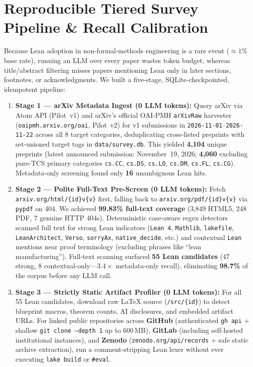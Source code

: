 \documentclass[11pt,letterpaper]{article}
\begin{document}
\section{Reproducible Tiered Survey Pipeline \& Recall Calibration}
\label{sec:pipeline}

Because Lean adoption in non-formal-methods engineering is a rare event ($\approx 1\%$ base rate), running an LLM over every paper wastes token budget, whereas title/abstract filtering misses papers mentioning Lean only in later sections, footnotes, or acknowledgments. We built a five-stage, SQLite-checkpointed, idempotent pipeline:

\begin{enumerate}
  \item \textbf{Stage 1 --- arXiv Metadata Ingest (0 LLM tokens):} Query arXiv via Atom API (Pilot~v1) and arXiv's official OAI-PMH \texttt{arXivRaw} harvester (\texttt{oaipmh.arxiv.org/oai}, Pilot~v2) for v1 submissions in \texttt{2026-11-01}--\texttt{2026-11-22} across all 8 target categories, deduplicating cross-listed preprints with set-unioned target tags in \texttt{data/survey.db}. This yielded \textbf{4,104} unique preprints (latest announced submission: November~19, 2026; \textbf{4,060} excluding pure-TCS primary categories \texttt{cs.CC}, \texttt{cs.DS}, \texttt{cs.LO}, \texttt{cs.DM}, \texttt{cs.FL}, \texttt{cs.CG}). Metadata-only screening found only \textbf{16} unambiguous Lean hits.
  \item \textbf{Stage 2 --- Polite Full-Text Pre-Screen (0 LLM tokens):} Fetch \texttt{arxiv.org/html/\{id\}v\{v\}} first, falling back to \texttt{arxiv.org/pdf/\{id\}v\{v\}} via \texttt{pypdf} on 404. We achieved \textbf{99.83\% full-text coverage} (3,849 HTML5, 248 PDF, 7 genuine HTTP 404s). Deterministic case-aware regex detectors scanned full text for strong Lean indicators (\texttt{Lean 4}, \texttt{Mathlib}, \texttt{lakefile}, \texttt{LeanArchitect}, \texttt{Verso}, \texttt{sorryAx}, \texttt{native\_decide}, etc.) and contextual \texttt{Lean} mentions near proof terminology (excluding phrases like ``lean manufacturing''). Full-text scanning surfaced \textbf{55 Lean candidates} (47 strong, 8 contextual-only---$3.4\times$ metadata-only recall), eliminating \textbf{98.7\%} of the corpus before any LLM call.
  \item \textbf{Stage 3 --- Strictly Static Artifact Profiler (0 LLM tokens):} For all 55 Lean candidates, download raw \LaTeX{} source (\texttt{/src/\{id\}}) to detect blueprint macros, theorem counts, AI disclosures, and embedded artifact URLs. For linked public repositories across \textbf{GitHub} (authenticated \texttt{gh api} + shallow \texttt{git clone --depth 1} up to 600\,MB), \textbf{GitLab} (including self-hosted institutional instances), and \textbf{Zenodo} (\texttt{zenodo.org/api/records} + safe static archive extraction), run a comment-stripping Lean lexer without ever executing \texttt{lake build} or \texttt{\#eval}.

\end{enumerate}
\end{document}
